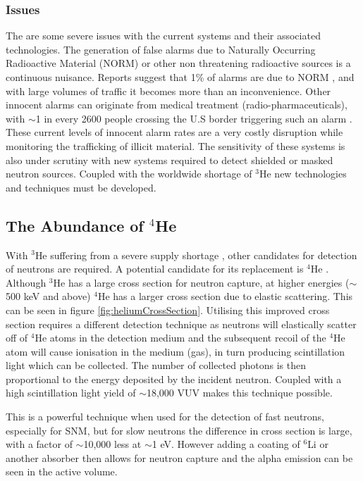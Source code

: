 \subsubsection{Issues}
The are some severe issues with the current systems and their associated technologies. The generation of false alarms due to Naturally Occurring Radioactive Material (NORM) or other non threatening radioactive sources is a continuous nuisance. Reports suggest that 1\% of alarms are due to NORM \cite{modesNORM}, and with large volumes of traffic it becomes more than an inconvenience. Other innocent alarms can originate from medical treatment (radio-pharmaceuticals), with $\sim$1 in every 2600 people crossing the U.S border triggering such an alarm \cite{modesRPMFalse}. These current levels of innocent alarm rates are a very costly disruption while monitoring the trafficking of illicit material. The sensitivity of these systems is also under scrutiny with new systems required to detect shielded or masked neutron sources. Coupled with the worldwide shortage of $^{3}$He new technologies and techniques must be developed.

\subsection{The Abundance of $^{4}$He}
With $^{3}$He suffering from a severe supply shortage \cite{helium3Shortage}, other candidates for detection of neutrons are required. A potential candidate for its replacement is $^{4}$He \cite{helium4Detectors}. Although $^{3}$He has a large cross section for neutron capture, at higher energies ($\sim$500 keV and above) $^{4}$He has a larger cross section due to elastic scattering. This can be seen in figure \ref{fig:heliumCrossSection}. Utilising this improved cross section requires a different detection technique as neutrons will elastically scatter off of $^{4}$He atoms in the detection medium and the subsequent recoil of the $^{4}$He atom will cause ionisation in the medium (gas), in turn producing scintillation light which can be collected. The number of collected photons is then proportional to the energy deposited by the incident neutron. Coupled with a high scintillation light yield of $\sim$18,000 VUV makes this technique possible. 

This is a powerful technique when used for the detection of fast neutrons, especially for SNM, but for slow neutrons the difference in cross section is large, with a factor of $\sim$10,000 less at $\sim$1 eV. However adding a coating of $^{6}$Li or another absorber then allows for neutron capture and the alpha emission can be seen in the active volume. 

